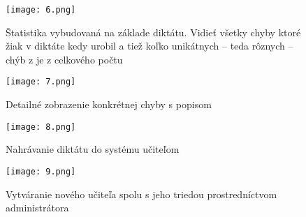 \documentclass[12pt,oneside]{fithesis2}
\begin{document}
			\begin{figure}
		\texttt{[image: 6.png]}
	\caption{Štatistika vybudovaná na základe diktátu. Vidieť všetky chyby ktoré žiak v diktáte kedy urobil a tiež koľko unikátnych -- teda rôznych -- chýb z je z celkového počtu}
	\end{figure}	
	
			\begin{figure}
		\texttt{[image: 7.png]}
	\caption{Detailné zobrazenie konkrétnej chyby s popisom}
	\end{figure}

		\begin{figure}
		\texttt{[image: 8.png]}
	\caption{Nahrávanie diktátu do systému učiteľom}
	\end{figure}
	
			\begin{figure}
		\texttt{[image: 9.png]}
	\caption{Vytváranie nového učiteľa spolu s jeho triedou prostredníctvom administrátora}
	\end{figure}
	
\end{document}

